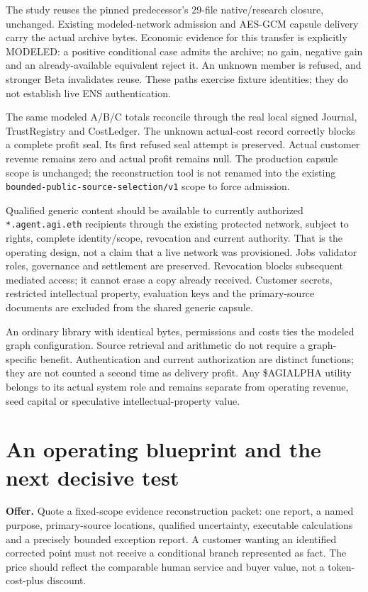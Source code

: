 The study reuses the pinned predecessor's 29-file native/research closure, unchanged. Existing modeled-network admission and AES-GCM capsule delivery carry the actual archive bytes. Economic evidence for this transfer is explicitly MODELED: a positive conditional case admits the archive; no gain, negative gain and an already-available equivalent reject it. An unknown member is refused, and stronger Beta invalidates reuse. These paths exercise fixture identities; they do not establish live ENS authentication.

The same modeled A/B/C totals reconcile through the real local signed Journal, TrustRegistry and CostLedger. The unknown actual-cost record correctly blocks a complete profit seal. Its first refused seal attempt is preserved. Actual customer revenue remains zero and actual profit remains null. The production capsule scope is unchanged; the reconstruction tool is not renamed into the existing \texttt{bounded-public-source-selection/v1} scope to force admission.

Qualified generic content should be available to currently authorized \texttt{*.agent.agi.eth} recipients through the existing protected network, subject to rights, complete identity/scope, revocation and current authority. That is the operating design, not a claim that a live network was provisioned. Jobs validator roles, governance and settlement are preserved. Revocation blocks subsequent mediated access; it cannot erase a copy already received. Customer secrets, restricted intellectual property, evaluation keys and the primary-source documents are excluded from the shared generic capsule.

An ordinary library with identical bytes, permissions and costs ties the modeled graph configuration. Source retrieval and arithmetic do not require a graph-specific benefit. Authentication and current authorization are distinct functions; they are not counted a second time as delivery profit. Any \$AGIALPHA utility belongs to its actual system role and remains separate from operating revenue, seed capital or speculative intellectual-property value.

\section{An operating blueprint and the next decisive test}

\textbf{Offer.} Quote a fixed-scope evidence reconstruction packet: one report, a named purpose, primary-source locations, qualified uncertainty, executable calculations and a precisely bounded exception report. A customer wanting an identified corrected point must not receive a conditional branch represented as fact. The price should reflect the comparable human service and buyer value, not a token-cost-plus discount.

